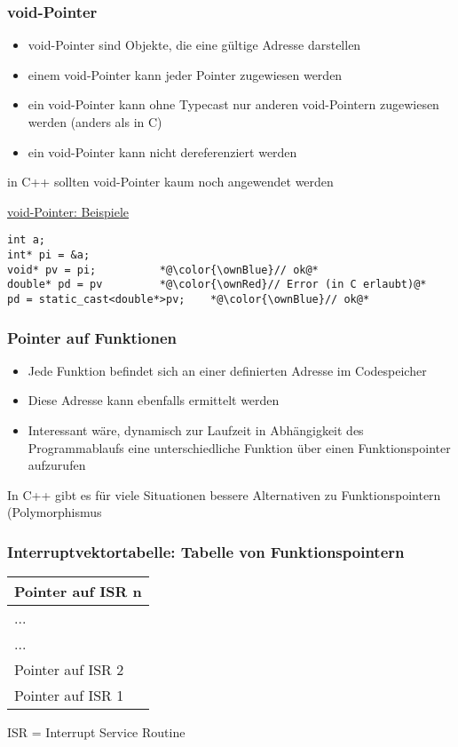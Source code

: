 \subsubsection{void-Pointer\hfill}
\label{sec:unterunterabschnitt}
\begin{itemize}
	\item void-Pointer sind Objekte, die eine gültige Adresse darstellen
	\item einem void-Pointer kann jeder Pointer zugewiesen werden
	\item \Large{ein void-Pointer kann ohne Typecast nur anderen void-Pointern zugewiesen werden (anders als in C)}\normalsize
	\item ein void-Pointer kann nicht dereferenziert werden
\end{itemize}
\begin{hinweis}
in C++ sollten void-Pointer kaum noch angewendet werden
\end{hinweis}
\underline{void-Pointer: Beispiele}\\
\noindent
\begin{minipage}{\linewidth}
\begin{lstlisting}
int a;
int* pi = &a;
void* pv = pi;			*@\color{\ownBlue}// ok@*
double* pd = pv			*@\color{\ownRed}// Error (in C erlaubt)@*
pd = static_cast<double*>pv;	*@\color{\ownBlue}// ok@*
\end{lstlisting}
\end{minipage}

\subsubsection{Pointer auf Funktionen\hfill}
\label{sec:unterunterabschnitt}
\begin{itemize}
	\item Jede Funktion befindet sich an einer definierten Adresse im Codespeicher
	\item Diese Adresse kann ebenfalls ermittelt werden
	\item Interessant wäre, dynamisch zur Laufzeit in Abhängigkeit des Programmablaufs eine unterschiedliche Funktion über einen Funktionspointer aufzurufen
\end{itemize}
\begin{hinweis}
In C++ gibt es für viele Situationen bessere Alternativen zu Funktionspointern (Polymorphismus
\end{hinweis}

\subsubsection{Interruptvektortabelle: Tabelle von Funktionspointern\hfill}
\label{sec:unterunterabschnitt}
\centering
\begin{tabularx}{0.25\textwidth}{|X|}
	\hline
	Pointer auf ISR n\\
	\hline
	...\\
	\hline
	...\\
	\hline
	Pointer auf ISR 2\\
	\hline
	Pointer auf ISR 1\\
	\hline
\end{tabularx}
\flushleft
ISR = Interrupt Service Routine

